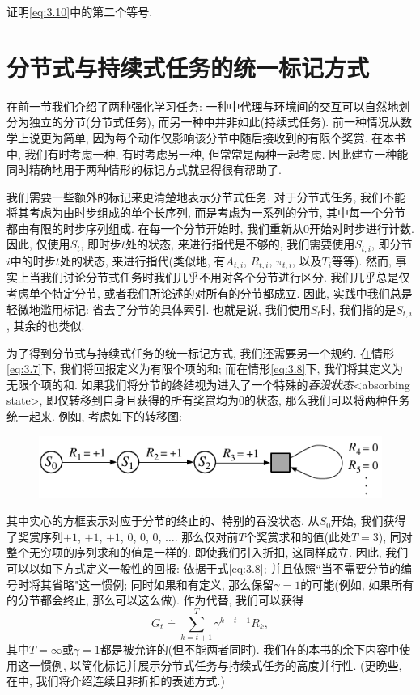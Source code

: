 \begin{exer}
证明\eqref{eq:3.10}中的第二个等号.
\end{exer}

\section{分节式与持续式任务的统一标记方式}\label{sec:3.4}

在前一节我们介绍了两种强化学习任务: 一种中代理与环境间的交互可以自然地划分为独立的分节(分节式任务), 而另一种中并非如此(持续式任务). 前一种情况从数学上说更为简单, 因为每个动作仅影响该分节中随后接收到的有限个奖赏. 在本书中, 我们有时考虑一种, 有时考虑另一种, 但常常是两种一起考虑. 因此建立一种能同时精确地用于两种情形的标记方式就显得很有帮助了.

我们需要一些额外的标记来更清楚地表示分节式任务. 对于分节式任务, 我们不能将其考虑为由时步组成的单个长序列, 而是考虑为一系列的分节, 其中每一个分节都由有限的时步序列组成. 在每一个分节开始时, 我们重新从0开始对时步进行计数. 因此, 仅使用$S_t$, 即时步$t$处的状态, 来进行指代是不够的, 我们需要使用$S_{t, i}$, 即分节$i$中的时步$t$处的状态, 来进行指代(类似地, 有$A_{t, i}$, $R_{t, i}$, $\pi_{t, i}$, 以及$T_i$等等). 然而, 事实上当我们讨论分节式任务时我们几乎不用对各个分节进行区分. 我们几乎总是仅考虑单个特定分节, 或者我们所论述的对所有的分节都成立. 因此, 实践中我们总是轻微地滥用标记: 省去了分节的具体索引. 也就是说, 我们使用$S_t$时, 我们指的是$S_{t, i}$, 其余的也类似.

为了得到分节式与持续式任务的统一标记方式, 我们还需要另一个规约. 在情形\eqref{eq:3.7}下, 我们将回报定义为有限个项的和; 而在情形\eqref{eq:3.8}下, 我们将其定义为无限个项的和. 如果我们将分节的终结视为进入了一个特殊的\emph{吞没状态}<absorbing state>, 即仅转移到自身且获得的所有奖赏均为0的状态, 那么我们可以将两种任务统一起来. 例如, 考虑如下的转移图:

\begin{figure}[ht]
\centering
\includegraphics[width=.7\textwidth]{c3/img/transition_graph.pdf}
\end{figure}

其中实心的方框表示对应于分节的终止的、特别的吞没状态. 从$S_0$开始, 我们获得了奖赏序列$+1$, $+1$, $+1$, $0$, $0$, $0$, $\dots$. 那么仅对前$T$个奖赏求和的值(此处$T = 3$), 同对整个无穷项的序列求和的值是一样的. 即使我们引入折扣, 这同样成立. 因此, 我们可以以如下方式定义一般性的回报: 依据于式\eqref{eq:3.8}; 并且依照``当不需要分节的编号时将其省略"这一惯例; 同时如果和有定义, 那么保留$\gamma = 1$的可能(例如, 如果所有的分节都会终止, 那么可以这么做). 作为代替, 我们可以获得
\begin{equation}\label{eq:3.11}
G_t \doteq \sum_{k = t + 1}^{T} \gamma^{k - t - 1} R_k,
\end{equation}
其中$T= \infty$或$\gamma = 1$都是被允许的(但不能两者同时). 我们在的本书的余下内容中使用这一惯例, 以简化标记并展示分节式任务与持续式任务的高度并行性. (更晚些, 在中, 我们将介绍连续且非折扣的表述方式.)

